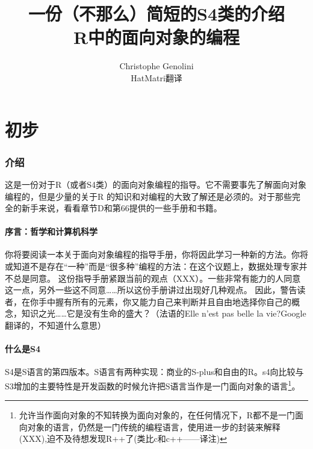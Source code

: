 \documentclass[12pt,a4paper]{article}\usepackage{graphicx, color}
\title{一份（不那么）简短的S4类的介绍\\[2ex]R中的面向对象的编程}
\author{Christophe Genolini{ }\\ HatMatri翻译}
\begin{document}
\maketitle

\part{初步}
\section{介绍}
这是一份对于R（或者S4类）的面向对象编程的指导。它不需要事先了解面向对象编程的，但是少量的关于R
的知识和对编程的大致了解还是必须的。对于那些完全的新手来说，看看章节D和第66提供的一些手册和书籍。
\subsection{序言：哲学和计算机科学}
你将要阅读一本关于面向对象编程的指导手册，你将因此学习一种新的方法。你将或知道不是存在“一种”而是“很多种”编程的方法：在这个议题上，数据处理专家并不总是同意。
这份指导手册紧跟当前的观点（XXX）。一些非常有能力的人同意这一点，另外一些这不同意……所以这份手册讲过出现好几种观点。
因此，警告读者，在你手中握有所有的元素，你又能力自己来判断并且自由地选择你自己的概念，知识之光……它是没有生命的盛大？（法语的Elle n’est pas
belle la vie?Google翻译的，不知道什么意思）

\subsection{什么是S4}
S4是S语言的第四版本。S语言有两种实现：商业的S-plus和自由的R。s4向比较与S3增加的主要特性是开发函数的时候允许把S语言当作是一门面向对象的语言\footnote{允许当作面向对象的不知转换为面向对象的，在任何情况下，R都不是一门面向对象的语言，仍然是一门传统的编程语言，使用进一步的封装来解释(XXX),迫不及待想发现R++了(类比c和c++——译注)}。
\end{document}
